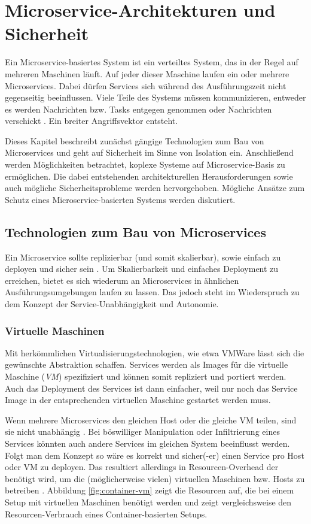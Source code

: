 \section{Microservice-Architekturen und Sicherheit}
\label{sec:ms-arch-sec}

Ein Microservice-basiertes System ist ein verteiltes System, das in der Regel auf mehreren Maschinen läuft. Auf jeder dieser Maschine laufen ein oder mehrere Microservices. Dabei dürfen Services sich während des Ausführungszeit nicht gegenseitig beeinflussen. Viele Teile des Systems müssen kommunizieren, entweder es werden Nachrichten bzw. Tasks entgegen genommen oder Nachrichten verschickt \cite{newman2015}. Ein breiter Angriffsvektor entsteht.

Dieses Kapitel beschreibt zunächst gängige Technologien zum Bau von Microservices und geht auf Sicherheit im Sinne von Isolation ein. Anschließend werden Möglichkeiten betrachtet, koplexe Systeme auf Microservice-Basis zu ermöglichen. Die dabei entstehenden architekturellen Herausforderungen sowie auch mögliche Sicherheitsprobleme werden hervorgehoben. Mögliche Ansätze zum Schutz eines Microservice-basierten Systems werden diskutiert.


\subsection{Technologien zum Bau von Microservices}

Ein Microservice sollte replizierbar (und somit skalierbar), sowie einfach zu deployen und sicher sein \cite{newman2015,microservicesIO}. Um Skalierbarkeit und einfaches Deployment zu erreichen, bietet es sich wiederum an Microservices in ähnlichen Ausführungsumgebungen laufen zu lassen. Das jedoch steht im Wiederspruch zu dem Konzept der Service-Unabhängigkeit und Autonomie. 

\subsubsection{Virtuelle Maschinen}
Mit herkömmlichen Virtualisierungstechnologien, wie etwa VMWare lässt sich die gewünschte Abstraktion schaffen. Services werden als Images für die virtuelle Maschine (\textit{VM}) spezifiziert und können somit repliziert und portiert werden. Auch das Deployment des Services ist dann einfacher, weil nur noch das Service Image in der entsprechenden virtuellen Maschine gestartet werden muss.

Wenn mehrere Microservices den gleichen Host oder die gleiche VM teilen, sind sie nicht unabhängig \cite{microservicesIO}. Bei böswilliger Manipulation oder Infiltrierung eines Services könnten auch andere Services im gleichen System beeinflusst werden. Folgt man dem Konzept so wäre es korrekt und sicher(-er) einen Service pro Host oder VM zu deployen. Das resultiert allerdings in Resourcen-Overhead der benötigt wird, um die (möglicherweise vielen) virtuellen Maschinen bzw. Hosts zu betreiben \cite{newman2015}. Abbildung \ref{fig:container-vm} zeigt die Resourcen auf, die bei einem Setup mit virtuellen Maschinen benötigt werden und zeigt vergleichsweise den Resourcen-Verbrauch eines Container-basierten Setups.

